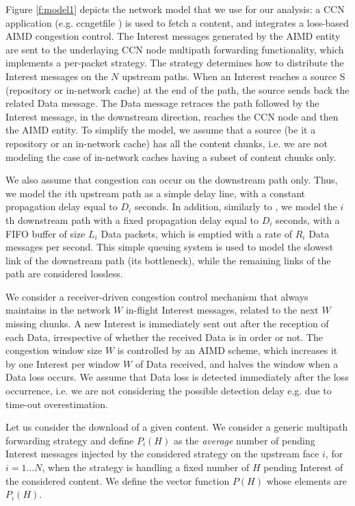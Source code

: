 \documentclass{sig-alternate-10pt}
\begin{document}
Figure \ref{f:model1} depicts the network model that we use for our analysis: a CCN application (e.g. ccngetfile \cite{ccnx}) is used to fetch a content, and integrates a loss-based AIMD congestion control. The Interest messages generated by the AIMD entity are sent to the underlaying CCN node multipath forwarding functionality, which implements a per-packet strategy. The strategy determines how to distribute the Interest messages on the $N$ upstream paths. When an Interest reaches a source S (repository or in-network cache) at the end of the path, the source sends back the related Data message. The Data message retraces the path followed by the Interest message, in the downstream direction, reaches the CCN node and then the AIMD entity. To simplify the model, we assume that a source (be it a repository or an in-network cache) has all the content chunks, i.e. we are not modeling the case of in-network caches having a subset of content chunks only. 

We also assume that congestion can occur on the downstream path only. Thus, we model the $i$th upstream path as a simple delay line, with a constant propagation delay equal to $D_i$ seconds. In addition, similarly to \cite{jacobson1988congestion}, we model the $i$th downstream path with a fixed propagation delay equal to $D_i$ seconds, with a FIFO buffer of size $L_i$ Data packets, which is emptied with a rate of $R_i$ Data messages per second. This simple queuing system is used to model the slowest link of the downstream path (its bottleneck), while the remaining links of the path are considered lossless.



We consider a receiver-driven congestion control mechanism that always maintains in the network $W$ in-flight Interest messages, related to the next $W$ missing chunks. A new Interest is immediately sent out after the reception of each Data, irrespective of whether the received Data is in order or not. The congestion window size $W$ is controlled by an AIMD scheme, which increases it by one Interest per window $W$ of Data received, and halves the window when a Data loss occurs. We assume that Data loss is detected immediately after the loss occurrence, i.e. we are not considering the possible detection delay e.g. due to time-out overestimation.    

Let us consider the download of a given content. We consider a generic multipath forwarding strategy and define $P_i(H)$ as the \emph{average} number of pending Interest messages injected by the considered strategy on the upstream face $i$, for $i=1 \dots N$, when the strategy is handling a fixed number of $H$ pending Interest of the considered content. We define the vector function $P(H)$ whose elements are $P_i(H)$.
\end{document}
